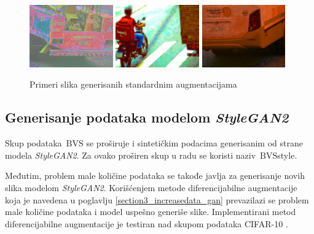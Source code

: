 \documentclass[12pt,oneside]{memoir}
\newcommand{\bvs}{\ensuremath{\,\textrm{BVS}}}
\begin{document}
\begin{figure}[!htbp]
  \includegraphics[width=0.32\textwidth]{matfmaster/glava4/basic_aug/7.jpg}
  \includegraphics[width=0.32\textwidth]{matfmaster/glava4/basic_aug/8.jpg}
  \includegraphics[width=0.32\textwidth]{matfmaster/glava4/basic_aug/9.jpg}
\caption{Primeri slika generisanih standardnim augmentacijama}\label{fig:basic_aug}
\end{figure}

  

\subsection{Generisanje podataka modelom \textit{StyleGAN2}}

Skup podataka \bvs{} se proširuje i sintetičkim podacima generisanim od strane modela \textit{StyleGAN2}. Za ovako proširen skup u radu se koristi naziv \bvs{style}. 

Međutim, problem male količine podataka se takođe javlja za generisanje novih slika modelom \textit{StyleGAN2}. Korišćenjem metode diferencijabilne augmentacije koja je navedena u poglavlju \ref{section3_increasedata_gan} prevazilazi se problem male količine podataka i model uspešno generiše slike. Implementirani metod diferencijabilne augmentacije je testiran nad skupom podataka CIFAR-10 \cite{2020diffaugment_report}.
\end{document}
